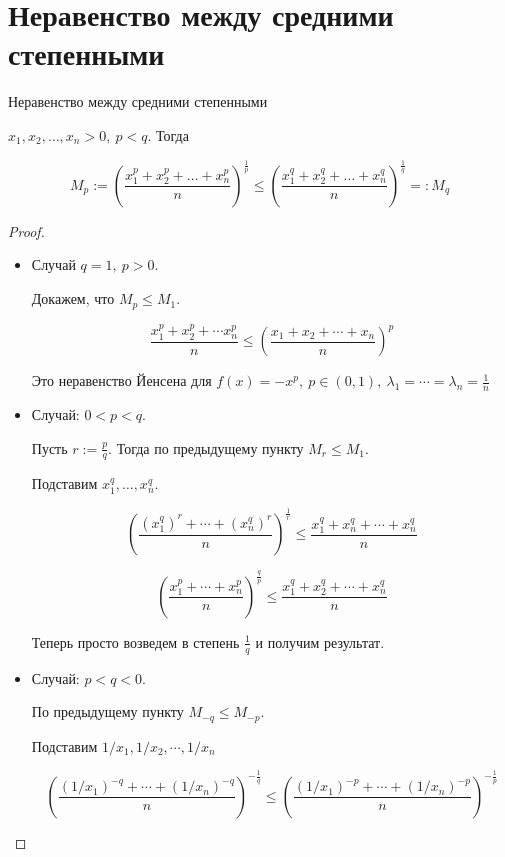 \section{Неравенство между средними степенными}
\begin{theorem-non}
    Неравенство между средними степенными

    $x_1, x_2, \dots, x_n > 0,\ p<q$. Тогда

    \[M_p:=\left(\frac{x_1^p+x_2^p+ \dots+x_n^p}{n}\right)^\frac{1}{p} \leqslant 
    \left(\frac{x_1^q+x_2^q+\dots+x_n^q}{n}\right)^\frac{1}q =: M_q\]
\end{theorem-non}

\begin{proof}
    \quad \\
    \begin{itemize} 
        \item Случай $q = 1,\ p>0$. 
        
        Докажем, что $M_p \leqslant M_1$.

        \[\frac{x_1^p+x_2^p+\cdots x_n^p}{n} \leqslant \left(\frac{x_1+x_2+\cdots+x_n}{n}\right)^p\]
    
        Это неравенство Йенсена для $f(x) = -x^p,\ p\in (0, 1),\ \lambda_1=\cdots=\lambda_n=\frac{1}{n}$
        \item Случай: $0 < p < q$. 
        
        Пусть $r:=\frac{p}{q}$. Тогда по предыдущему пункту $M_r \leqslant M_1$.
        
        Подставим $x_1^q,\dots, x_n^q$.
    
        \[\left(\frac{(x_1^q)^r+\cdots+(x_n^q)^r}{n}\right  )^\frac{1}{r} \leqslant
        \frac{x_1^q+x_n^q+\cdots+x_n^q}{n}\]
    
        \[\left(\frac{x_1^p+\cdots+x_n^p}{n}\right)^\frac{q}{p} \leqslant
        \frac{x_1^q+x_2^q+\cdots+x_n^q}{n}\]
    
        Теперь просто возведем в степень $\frac{1}{q}$ и получим результат.
        \item Случай: $p < q < 0$.
        
        По предыдущему пункту $M_{-q} \leqslant M_{-p}$. 
        
        Подставим $1/x_1, 1/x_2,\cdots, 1/x_n$

        \[ \left(\frac{(1/x_1)^{-q}+\cdots+(1/x_n)^{-q}}{n}\right)^{-\frac{1}{q}} \leqslant
        \left(\frac{(1/x_1)^{-p} + \cdots + (1/x_n)^{-p} }{n}\right)^{-\frac{1}{p}} \]
    

\end{itemize}
\end{proof}
